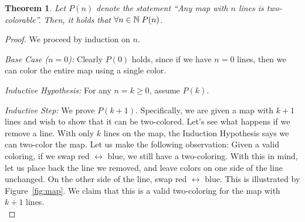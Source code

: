 \documentclass[11pt]{article}
\newcounter{thm}
\newtheorem{theorem}{Theorem}[thm]
\begin{document}
\begin{theorem}\label{thm:2color}
    Let $P(n)$ denote the statement ``Any map with $n$ lines is two-colorable''. Then, it holds that $\forall n\in \mathbb{N}\; P(n)$.
\end{theorem}
\begin{proof}
We proceed by induction on $n$.

\emph{Base Case ($n=0$):} Clearly $P(0)$ holds, since if we have $n=0$ lines, then we can color
the entire map using a single color.

\emph{Inductive Hypothesis:} For any $n=k\geq 0$, assume $P(k)$.

\emph{Inductive Step:} We prove $P(k+1)$. Specifically, we are given a map with $k+1$ lines and wish to show
that it can be two-colored. Let's see what happens if we remove a line. With only $k$
lines on the map, the Induction Hypothesis says we can two-color the map. Let us make
the following observation: Given a valid coloring, if we swap red $\leftrightarrow$ blue, we still have a two-coloring.
With this in mind, let us place back the line we removed, and leave colors on one side of the line
unchanged. On the other side of the line, swap red $\leftrightarrow$ blue. This is illustrated by Figure~\ref{fig:map}. We claim that this is a valid two-coloring for the map with $k+1$ lines.\\


\end{proof}
\end{document}
